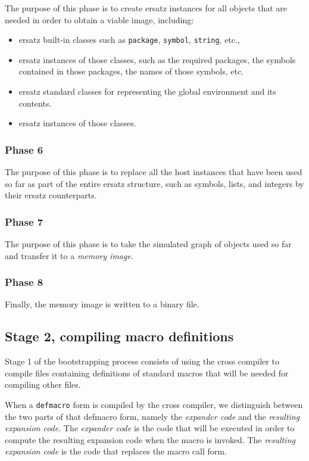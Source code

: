 The purpose of this phase is to create ersatz instances for all
objects that are needed in order to obtain a viable image, including: 

\begin{itemize}
\item ersatz built-in classes such as \texttt{package}, \texttt{symbol},
  \texttt{string}, etc., 
\item ersatz instances of those classes, such as the required
  packages, the symbols contained in those packages, the names of
  those symbols, etc.
\item ersatz standard classes for representing the global environment
  and its contents.
\item ersatz instances of those classes.
\end{itemize}

\subsubsection{Phase 6}

The purpose of this phase is to replace all the host instances that
have been used so far as part of the entire ersatz structure, such as
symbols, lists, and integers by their ersatz counterparts.

\subsubsection{Phase 7}

The purpose of this phase is to take the simulated graph of objects
used so far and transfer it to a \emph{memory image}.  

\subsubsection{Phase 8}

Finally, the memory image is written to a binary file. 


\subsection{Stage 2, compiling macro definitions}

Stage 1 of the bootstrapping process consists of using the cross
compiler to compile files containing definitions of standard macros
that will be needed for compiling other files. 

When a \texttt{defmacro} form is compiled by the cross compiler, we
distinguish between the two parts of that defmacro form, namely the
\emph{expander code} and the \emph{resulting expansion code}.  The
\emph{expander code} is the code that will be executed in order to
compute the resulting expansion code when the macro is invoked.  The
\emph{resulting expansion code} is the code that replaces the macro
call form. 

